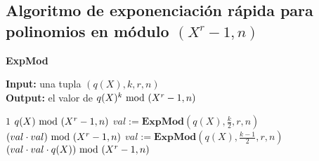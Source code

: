 


\subsection{Algoritmo de exponenciación rápida para polinomios en módulo $(X^r-1,n)$}
\label{app-fast_exp_mod}
\begin{algorithm}[H]
\caption{\quad\textbf{ExpMod}}
\label{alg:fast_exp_mod}
\hspace*{\algorithmicindent} \textbf{Input:} una tupla $(q(X), k, r, n)$\\
\hspace*{\algorithmicindent} \textbf{Output:} el valor de $q(X)^k \!\! \mod(X^r-1,n)$
\begin{algorithmic}[1]
		\RETURN $1$
    	\RETURN $q(X)  \!\! \mod(X^r-1,n)$
    	\STATE $val :=\textbf{ExpMod}(q(X),\frac{k}{2}, r, n)$
      	\RETURN $(val\cdot val)  \!\! \mod(X^r-1,n)$
   	\ELSE
   		\STATE $val :=\textbf{ExpMod}(q(X),\frac{k-1}{2}, r, n)$
	  	\RETURN $(val\cdot val\cdot q(X))  \!\! \mod(X^r-1,n)$   
	  	\ENDIF         
\end{algorithmic}
\end{algorithm}

